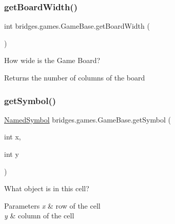 \subsubsection{\texorpdfstring{getBoardWidth()}{getBoardWidth()}}
{\footnotesize\ttfamily int bridges.\+games.\+Game\+Base.\+get\+Board\+Width (\begin{DoxyParamCaption}{ }\end{DoxyParamCaption})\hspace{0.3cm}{\ttfamily [protected]}}



How wide is the Game Board? 

\begin{DoxyReturn}{Returns}
the number of columns of the board 
\end{DoxyReturn}
\mbox{\label{classbridges_1_1games_1_1_game_base_ad7c48a1551044b5f2d0357448cdd3124}} 
\subsubsection{\texorpdfstring{getSymbol()}{getSymbol()}}
{\footnotesize\ttfamily \mbox{\hyperlink{enumbridges_1_1base_1_1_named_symbol}{Named\+Symbol}} bridges.\+games.\+Game\+Base.\+get\+Symbol (\begin{DoxyParamCaption}\item[{int}]{x,  }\item[{int}]{y }\end{DoxyParamCaption})\hspace{0.3cm}{\ttfamily [protected]}}



What object is in this cell? 


\begin{DoxyParams}{Parameters}
{\em x} & row of the cell \\
\hline
{\em y} & column of the cell \\
\hline
\end{DoxyParams}
\mbox{\label{classbridges_1_1games_1_1_game_base_a07d351db46d88b49471baa68eed23e54}} 
